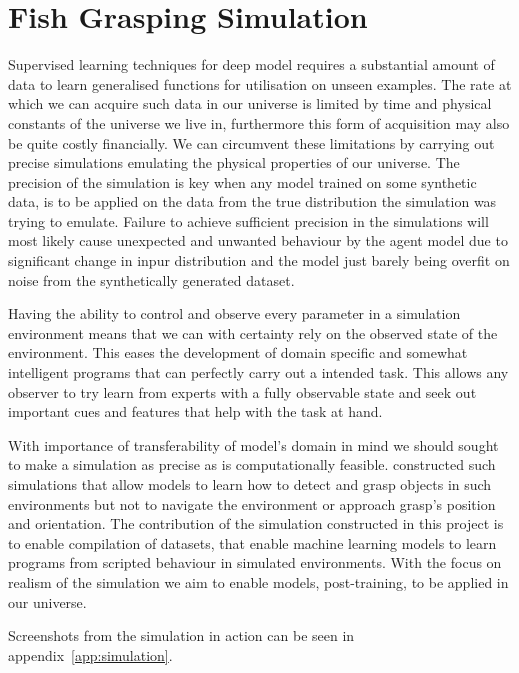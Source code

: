 \section{Fish Grasping Simulation}\label{sec:simulation}

Supervised learning techniques for deep model requires a substantial amount of data to learn generalised functions for utilisation on unseen examples. The rate at which we can acquire such data in our universe is limited by time and physical constants of the universe we live in, furthermore this form of acquisition may also be quite costly financially. We can circumvent these limitations by carrying out precise simulations emulating the physical properties of our universe. The precision of the simulation is key when any model trained on some synthetic data, is to be applied on the data from the true distribution %
the simulation was trying to emulate. 
Failure to achieve sufficient precision in the simulations will most likely cause unexpected and unwanted behaviour by the agent model due to significant change in inpur distribution and the model just barely being overfit on noise from the synthetically generated dataset.

Having the ability to control and observe every parameter in a simulation environment means that we can with certainty rely on the observed state of the environment. This eases the development of domain specific and somewhat intelligent programs that can perfectly carry out a intended task. This allows any observer to try learn from experts with a fully observable state and seek out important cues and features that help with the task at hand.   

With importance of transferability of model's domain in mind we should sought to make a simulation as precise as is computationally feasible. \cite{Dyrstad2016} constructed such simulations that allow models to learn how to detect and grasp objects in such environments but not to navigate the environment or approach grasp's position and orientation. The contribution of the simulation constructed in this project is to enable compilation of datasets, that enable machine learning models to learn programs from scripted behaviour in simulated environments. With the focus on realism of the simulation we aim to enable models, post-training, to be applied in our universe.

Screenshots from the simulation in action can be seen in appendix~\ref{app:simulation}.

